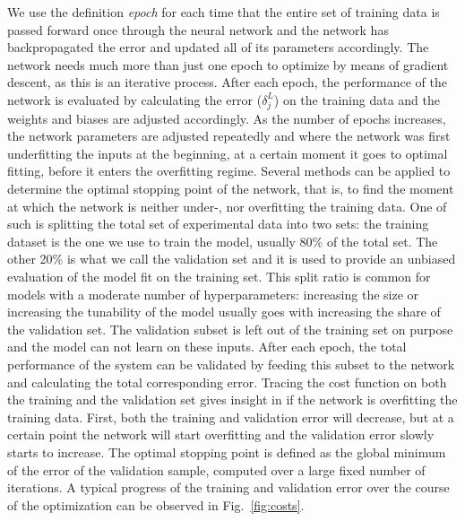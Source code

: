 We use the definition {\it epoch} for each time that
the entire set of training data is passed forward once through the neural network 
and the network has backpropagated the error and updated all of its parameters
accordingly. 
%
The network needs much more than just one epoch to optimize by means of 
gradient descent, as this is an iterative process. 
%
After each epoch, the performance of the network is evaluated by calculating
the error ($ \delta_j^L$) on the training data and the weights and biases
are adjusted accordingly.
%
As the number of epochs increases, the network parameters are adjusted
repeatedly and where the network was first underfitting the inputs at
the beginning, at a certain moment it goes to optimal fitting,
before it enters the overfitting regime.
%
Several methods can be applied to determine the optimal stopping point
of the network, that is, to find the moment at which the network is
neither under-, nor overfitting the training data. 
%
One of such is splitting the total set of experimental data into two sets:
the training dataset is the one we use to train the model, usually
80\% of the total set.
%
The other 20\% is what we call the validation set and it is used to provide
an unbiased evaluation of the model fit on the training set. 
%
This split ratio is common for models with a moderate number of hyperparameters:
increasing the size or increasing the tunability of the model usually goes with increasing the share of the
validation set. 
%
The validation subset is left out of the training set on purpose and the model
can not learn on these inputs.
%
After each epoch, the total performance of the
system can be validated by feeding this subset to the network and calculating
the total corresponding error.
%
Tracing the cost function on both the training and the validation set 
gives insight in if the network is overfitting the training data.
First, both the training and validation error will decrease, 
but at a certain point the network will start overfitting and the
validation error slowly starts to increase. 
%
The optimal stopping point is defined as the global minimum of the 
error of the validation sample, computed over a large fixed number of 
iterations.
%
A typical progress of the training and validation error over the 
course of the optimization can be observed in Fig.~\ref{fig:costs}.

